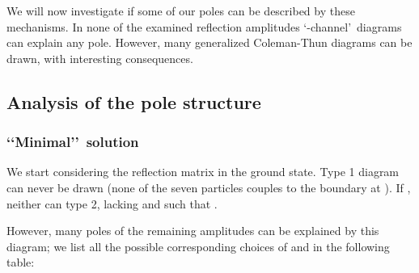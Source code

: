 \documentclass[a4paper,12pt]{report}
\begin{document}
\vspace{0.5cm}

We will now investigate if some of our poles can be described by these mechanisms. In none of the examined
reflection amplitudes \lq{}\coordHE{}-channel\rq \, diagrams can explain any pole. However, many generalized Coleman-Thun
diagrams can be drawn, with interesting consequences.

\vspace{0.5cm}

\subsection{Analysis of the \coordHE{} pole structure}

\subsubsection{\lq\lq Minimal\rq\rq \, solution}

We start considering the reflection matrix in the ground state. Type 1 diagram can never be drawn (none of the
seven particles couples to the boundary at \coordHE{}). If \coordHE{}, neither can type 2, lacking \coordHE{}
and \coordHE{} such that \coordHE{}.

However, many poles of the remaining amplitudes can be explained by this diagram; we list all the possible
corresponding choices of \coordHE{} and \coordHE{} in the following table:
\end{document}
